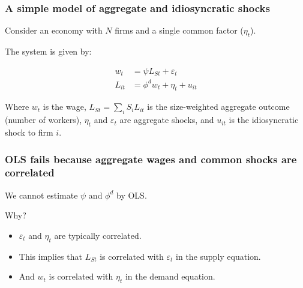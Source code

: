 \documentclass[aspectratio=169,11pt]{beamer}
\begin{document}
\begin{frame}
    \frametitle{A simple model of aggregate and idiosyncratic shocks}

    Consider an economy with $N$ firms and a single common factor ($\eta_t$).

    \vspace{0.8cm}
    The system is given by:

    \vspace{0.5cm}
    \begin{align}
        w_t    & = \psi L_{St} + \varepsilon_t \tag{38}  \\[0.5cm]
        L_{it} & = \phi^d w_t + \eta_t + u_{it} \tag{39}
    \end{align}

    \vspace{0.8cm}
    Where $w_t$ is the wage, $L_{St} = \sum_i S_i L_{it}$ is the size-weighted aggregate outcome (number of workers), $\eta_t$ and $\varepsilon_t$ are aggregate shocks, and $u_{it}$ is the idiosyncratic shock to firm $i$.

\end{frame}

\begin{frame}
    \frametitle{OLS fails because aggregate wages and common shocks are correlated}

    \vspace{0.5cm}
    {\Large
        We cannot estimate $\psi$ and $\phi^d$ by OLS.
    }

    \vspace{1cm}
    {\Large
        Why?
    }

    \vspace{0.5cm}
    \begin{itemize}
        \item $\varepsilon_t$ and $\eta_t$ are typically correlated.
        \item This implies that $L_{St}$ is correlated with $\varepsilon_t$ in the supply equation.
        \item And $w_t$ is correlated with $\eta_t$ in the demand equation.
    \end{itemize}

\end{frame}
\end{document}
